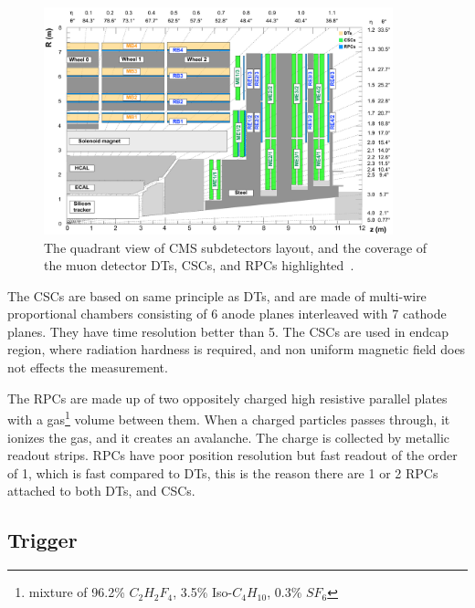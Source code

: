 \begin{figure}[!ht]
  \centering
  \includegraphics[width=0.9\textwidth]{figures/cms_muon_system.pdf}
  \caption[The quadrant view of CMS subdetectors layout, and
    the coverage of the muon detector \glspl{DT}, \glspl{CSC},
    and \glspl{RPC} highlighted]%
  {The quadrant view of CMS subdetectors layout, and
    the coverage of the muon detector \glspl{DT}, \glspl{CSC},
    and \glspl{RPC} highlighted~\cite{image-cms-muon-system}.}%
  \label{fig:cms-muon-system}
\end{figure}

The \glspl{CSC} are based on same principle as \glspl{DT},
and are made of multi-wire proportional chambers consisting of
6 anode planes interleaved with 7 cathode planes. They have time resolution
better than 5\nanoseconds. The \glspl{CSC} are used in endcap region,
where radiation hardness is required, and non uniform magnetic field does not
effects the measurement.

The \glspl{RPC} are made up of two oppositely charged high resistive parallel
plates with a gas\footnote{mixture of 96.2\% \( C_{2}H_{2}F_{4} \), 3.5\% Iso-\( C_{4}H_{10} \),
0.3\% \( S{F}_{6} \)} volume between them.
When a charged particles passes through, it ionizes the gas, and it creates
an avalanche. The charge is collected by metallic readout strips.
\glspl{RPC} have poor position resolution but fast readout of the order of 1\nanoseconds,
which is fast compared to \glspl{DT}, this is the reason there are 1 or 2 \glspl{RPC}
attached to both \glspl{DT}, and \glspl{CSC}.

\subsection{
  Trigger
}\label{ch_cms:L1T}

